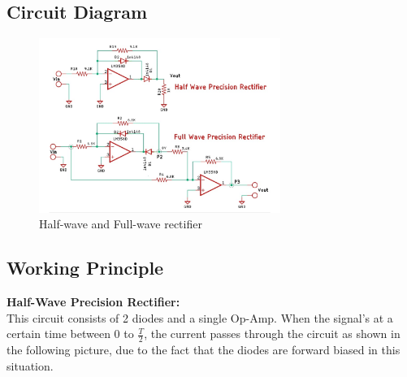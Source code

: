 \documentclass[a4paper,12pt]{article}
\begin{document}
\subsection{Circuit Diagram}
\begin{figure}[H]
    \centering
    \includegraphics[width=0.7\textwidth]{fig/hf.jpeg} %
    \caption{Half-wave and Full-wave rectifier}
\end{figure}

\subsection{Working Principle}
\textbf{Half-Wave Precision Rectifier:}\\
This circuit consists of 2 diodes and a single Op-Amp. When the signal's at a certain time between 0 to $\frac{T}{2}$, the current passes through the circuit as shown in the following picture, due to the fact that the diodes are forward biased in this situation.\\
\end{document}
